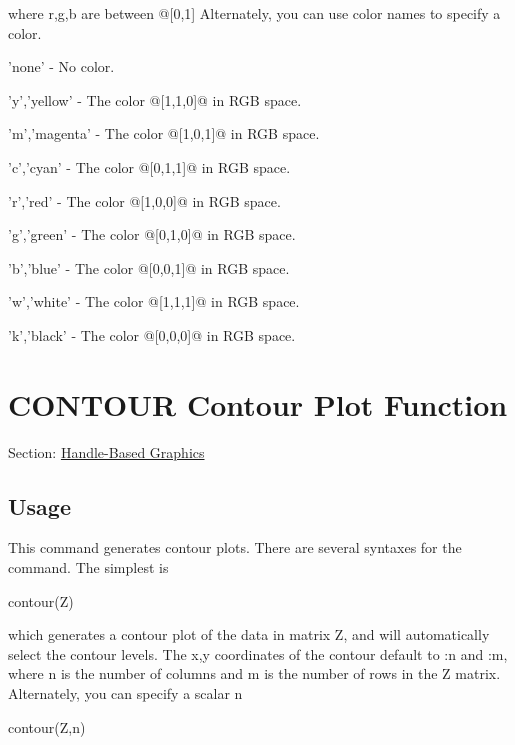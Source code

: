  where {\ttfamily r,g,b} are between @\mbox{[}0,1\mbox{]} Alternately, you can use color names to specify a color. 
\begin{DoxyItemize}
\item {\ttfamily 'none'} -\/ No color.  
\item {\ttfamily 'y','yellow'} -\/ The color @\mbox{[}1,1,0\mbox{]}@ in R\-G\-B space.  
\item {\ttfamily 'm','magenta'} -\/ The color @\mbox{[}1,0,1\mbox{]}@ in R\-G\-B space.  
\item {\ttfamily 'c','cyan'} -\/ The color @\mbox{[}0,1,1\mbox{]}@ in R\-G\-B space.  
\item {\ttfamily 'r','red'} -\/ The color @\mbox{[}1,0,0\mbox{]}@ in R\-G\-B space.  
\item {\ttfamily 'g','green'} -\/ The color @\mbox{[}0,1,0\mbox{]}@ in R\-G\-B space.  
\item {\ttfamily 'b','blue'} -\/ The color @\mbox{[}0,0,1\mbox{]}@ in R\-G\-B space.  
\item {\ttfamily 'w','white'} -\/ The color @\mbox{[}1,1,1\mbox{]}@ in R\-G\-B space.  
\item {\ttfamily 'k','black'} -\/ The color @\mbox{[}0,0,0\mbox{]}@ in R\-G\-B space.  
\end{DoxyItemize}\hypertarget{handle_contour}{}\section{C\-O\-N\-T\-O\-U\-R Contour Plot Function}\label{handle_contour}
Section\-: \hyperlink{sec_handle}{Handle-\/\-Based Graphics} \hypertarget{vtkwidgets_vtkxyplotwidget_Usage}{}\subsection{Usage}\label{vtkwidgets_vtkxyplotwidget_Usage}
This command generates contour plots. There are several syntaxes for the command. The simplest is \begin{DoxyVerb}  contour(Z)
\end{DoxyVerb}
 which generates a contour plot of the data in matrix {\ttfamily Z}, and will automatically select the contour levels. The {\ttfamily x,y} coordinates of the contour default to {\-:n} and {\-:m}, where {\ttfamily n} is the number of columns and {\ttfamily m} is the number of rows in the {\ttfamily Z} matrix. Alternately, you can specify a scalar {\ttfamily n} \begin{DoxyVerb}  contour(Z,n)
\end{DoxyVerb}
